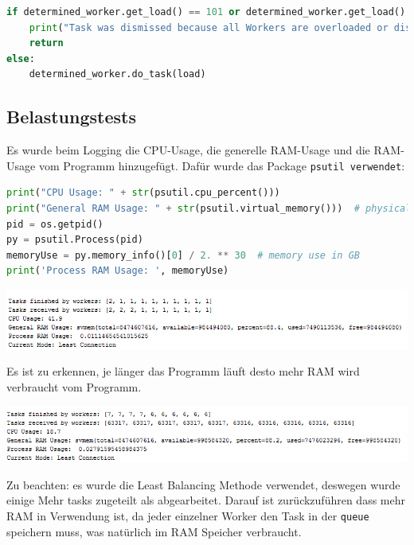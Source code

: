 \begin{lstlisting}[language=python]
if determined_worker.get_load() == 101 or determined_worker.get_load() == 99:
	print("Task was dismissed because all Workers are overloaded or disabled!")
	return
else:
	determined_worker.do_task(load)
\end{lstlisting}

\subsection{Belastungstests}
Es wurde beim Logging die CPU-Usage, die generelle RAM-Usage und die RAM-Usage vom Programm hinzugefügt. Dafür wurde das Package \verb|psutil verwendet|:

\begin{lstlisting}[language=python]
print("CPU Usage: " + str(psutil.cpu_percent()))
print("General RAM Usage: " + str(psutil.virtual_memory()))  # physical memory usage
pid = os.getpid()
py = psutil.Process(pid)
memoryUse = py.memory_info()[0] / 2. ** 30  # memory use in GB
print('Process RAM Usage: ', memoryUse)
\end{lstlisting}

\begin{minipage}{\linewidth}
	\centering
	\includegraphics[width=1\linewidth]{images/belastung}
\end{minipage}

Es ist zu erkennen, je länger das Programm läuft desto mehr RAM wird verbraucht vom Programm.

\begin{minipage}{\linewidth}
	\centering
	\includegraphics[width=1\linewidth]{images/belastung2}
\end{minipage}

Zu beachten: es wurde die Least Balancing Methode verwendet, deswegen wurde einige Mehr tasks zugeteilt als abgearbeitet. Darauf ist zurückzuführen dass mehr RAM in Verwendung ist, da jeder einzelner Worker den Task in der \verb|queue| speichern muss, was natürlich im RAM Speicher verbraucht. 

